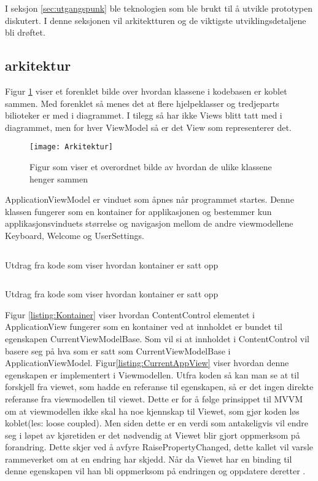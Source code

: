 { 
I seksjon \ref{sec:utgangspunk} ble teknologien som ble brukt til å utvikle prototypen diskutert. I denne seksjonen vil arkitektturen og de viktigste utviklingsdetaljene  bli drøftet.  
 
 
\subsection{arkitektur} 
 
 
Figur \ref{fig:arkitektur} viser et forenklet bilde over hvordan klassene i kodebasen er koblet sammen. Med forenklet så menes det at flere hjelpeklasser og tredjeparts bilioteker er med i diagrammet. I tilegg så har ikke Views blitt tatt med i diagrammet, men for hver ViewModel så er det View som representerer det.  
 
 
 
 
\begin{figure}[ht] 
\centering 
\texttt{[image: Arkitektur]} 
\caption{Figur som viser et overordnet bilde av hvordan de ulike klassene henger sammen} 
\label{fig:arkitektur} 
\end{figure} 
 

 
ApplicationViewModel er vinduet som åpnes når programmet startes. Denne klassen fungerer som en kontainer for applikasjonen og bestemmer kun applikasjonsvinduets størrelse og navigasjon mellom de andre viewmodellene Keyboard, Welcome og UserSettings.  
 
 
\begin{listing}[ht] 
\inputminted{xml}{Code/ApplicationContainer.xml} 
\caption{Utdrag fra kode som viser hvordan kontainer er satt opp} 
\label{listing:Kontainer} 
\end{listing} 
 
 
\begin{listing}[ht] 
\inputminted{csharp}{Code/CurrentApplicationView.cs} 
\caption{Utdrag fra kode som viser hvordan kontainer er satt opp} 
\label{listing:CurrentAppView} 
\end{listing} 
 
 
 
 
Figur \ref{listing:Kontainer} viser hvordan ContentControl elementet i ApplicationView fungerer som en kontainer ved at innholdet er bundet til egenskapen CurrentViewModelBase. Som vil si at innholdet i ContentControl vil basere seg på hva som er satt som CurrentViewModelBase i ApplicationViewModel. Figur\ref{listing:CurrentAppView} viser hvordan denne egenskapen er implementert i Viewmodellen. Utfra koden så kan man se at til forskjell fra viewet, som hadde en referanse til egenskapen, så er det ingen direkte referanse fra viewmodellen til viewet. Dette er for å følge prinsippet til MVVM om at viewmodellen ikke skal ha noe kjennskap til Viewet, som gjør koden løs koblet(les: loose coupled). Men siden dette er en verdi som antakeligvis vil endre seg i løpet av kjøretiden er det nødvendig at Viewet blir gjort oppmerksom på forandring. Dette skjer ved å avfyre RaisePropertyChanged, dette kallet vil varsle rammeverket om at en endring har skjedd. Når da Viewet har en binding til denne egenskapen vil han bli oppmerksom på endringen og oppdatere deretter \cite{MVVM4:online}. 
 
}

